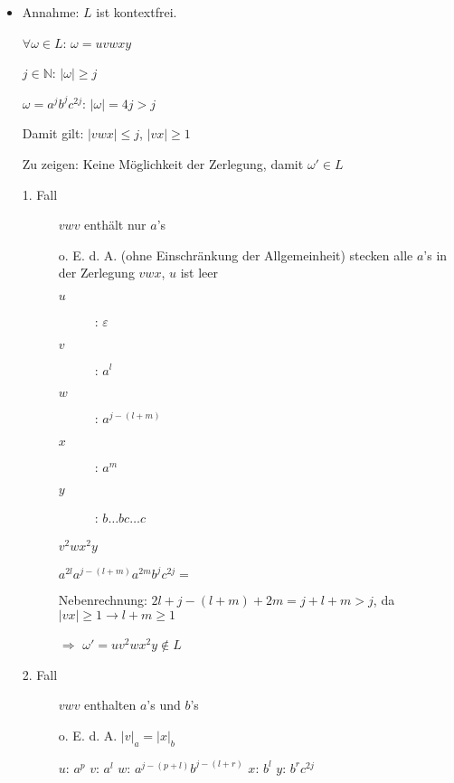 \documentclass{bschlangaul-aufgabe}
\begin{document}
\begin{itemize}

%

\item {}

\begin{bAntwort}
Annahme: $L$ ist kontextfrei.

$\forall \omega \in L$: $\omega = uvwxy$

$j \in \mathbb{N}$: $|\omega| \geq j$

$\omega = a^j b^j c^{2j}$: $|\omega| = 4j > j$

Damit gilt: $|vwx| \leq j$, $|vx| \geq 1$

Zu zeigen: Keine Möglichkeit der Zerlegung, damit $\omega' \in L$

\begin{description}

%

\item[1. Fall]

$vwv$ enthält nur $a$'s

o. E. d. A. (ohne Einschränkung der Allgemeinheit) stecken alle $a$'s in
der Zerlegung $vwx$, \dh $u$ ist leer

\begin{description}
\item[$u$]: $\varepsilon$
\item[$v$]: $a^l$
\item[$w$]: $a^{j-(l+m)}$
\item[$x$]: $a^m$
\item[$y$]: $b\dots b c \dots c$
\end{description}

$v^2 w x^2 y$

$a^{2l} a^{j-(l+m)} a^{2m} b^j c^{2j} =   $

Nebenrechnung: $2l + j - (l + m) + 2m = j + l + m > j$,
da $|vx| \geq 1 \rightarrow l + m \geq 1$

$\Rightarrow$ $\omega' = uv^2wx^2y \notin L$

%

\item[2. Fall]

$vwv$ enthalten $a$'s und $b$'s

o. E. d. A. $|v|_a = |x|_b$

$u$: $a^p$
$v$: $a^l$
$w$: $a^{j-(p+l)} b^{j-(l+r)}$
$x$: $b^l$
$y$: $b^r c^{2j}$


\end{description}
\end{bAntwort}
\end{itemize}
\end{document}
